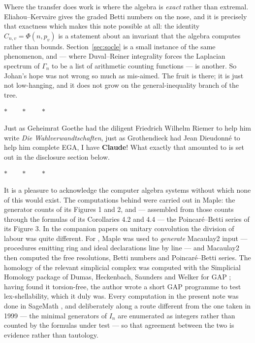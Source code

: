 \documentclass[a4paper,11pt,oneside,reqno]{amsart}
\theoremstyle{definition}
\theoremstyle{remark}
\theoremstyle{plain}
\newcommand{\Gam}{\Gamma}
\begin{document}
Where the transfer does work is where the algebra is \emph{exact} rather than
extremal. Eliahou--Kervaire gives the graded Betti numbers on the nose, and it
is precisely that exactness which makes this note possible at all: the identity
\(C_{n,v} = \Phi(n,p_v)\) is a statement about an invariant that the algebra
computes rather than bounds. Section~\ref{sec:socle} is a small instance of the
same phenomenon, and \cite{SnellmanLaplacians} --- where Duval--Reiner
integrality forces the Laplacian spectrum of \(\Gam_n\) to be a list of
arithmetic counting functions --- is another. So Johan's hope was not wrong so
much as mis-aimed. The fruit is there; it is just not low-hanging, and it does
not grow on the general-inequality branch of the tree.

\begin{center}\small\(\ast\qquad\ast\qquad\ast\)\end{center}

Just as Geheimrat Goethe had the diligent Friedrich Wilhelm Riemer to help him
write \emph{Die Wahlverwandtschaften}, just as Grothendieck had Jean Dieudonné
to help him complete EGA, I have \textbf{Claude}! What exactly that amounted to
is set out in the disclosure section below.

\begin{center}\small\(\ast\qquad\ast\qquad\ast\)\end{center}

It is a pleasure to acknowledge the computer algebra systems without which
none of this would exist. The computations behind \cite{Snellman2000} were
carried out in \textsf{Maple}: the generator counts of its Figures 1 and 2,
and --- assembled from those counts through the formulas of its Corollaries 4.2
and 4.4 --- the Poincaré--Betti series of its Figure 3. In the companion papers
on unitary convolution the division of labour was quite different. For
\cite{SnellmanUnitaryGeneral,SnellmanUnitaryN}, \textsf{Maple} was used to \emph{generate}
\textsf{Macaulay2} \cite{Macaulay2} input --- procedures emitting ring and
ideal declarations line by line --- and \textsf{Macaulay2} then computed the
free resolutions, Betti numbers and Poincaré--Betti series. The homology of the
relevant simplicial complex was computed with the \textsf{Simplicial Homology}
package \cite{SimplicialHomology} of Dumas, Heckenbach, Saunders and Welker for
\textsf{GAP} \cite{GAP}; having found it torsion-free, the author wrote a short
\textsf{GAP} programme to test lex-shellability, which it duly was. Every
computation in the present note was done in \textsf{SageMath} \cite{Sage}, and
deliberately along a route different from the one taken
in 1999 --- the minimal generators of \(I_n\) are enumerated as integers rather
than counted by the formulas under test --- so that agreement between the two is
evidence rather than tautology.
\end{document}
